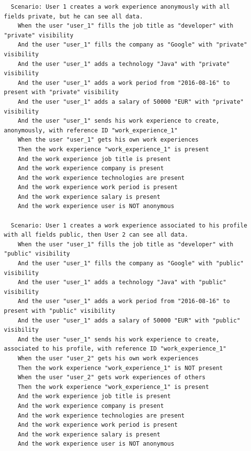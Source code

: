 \documentclass[a4paper, 12pt]{book}
\begin{document}
{\begin{verbatim}
  Scenario: User 1 creates a work experience anonymously with all fields private, but he can see all data.
    When the user "user_1" fills the job title as "developer" with "private" visibility
    And the user "user_1" fills the company as "Google" with "private" visibility
    And the user "user_1" adds a technology "Java" with "private" visibility
    And the user "user_1" adds a work period from "2016-08-16" to present with "private" visibility
    And the user "user_1" adds a salary of 50000 "EUR" with "private" visibility
    And the user "user_1" sends his work experience to create, anonymously, with reference ID "work_experience_1"
    When the user "user_1" gets his own work experiences
    Then the work experience "work_experience_1" is present
    And the work experience job title is present
    And the work experience company is present
    And the work experience technologies are present
    And the work experience work period is present
    And the work experience salary is present
    And the work experience user is NOT anonymous

  Scenario: User 1 creates a work experience associated to his profile with all fields public, then User 2 can see all data.
    When the user "user_1" fills the job title as "developer" with "public" visibility
    And the user "user_1" fills the company as "Google" with "public" visibility
    And the user "user_1" adds a technology "Java" with "public" visibility
    And the user "user_1" adds a work period from "2016-08-16" to present with "public" visibility
    And the user "user_1" adds a salary of 50000 "EUR" with "public" visibility
    And the user "user_1" sends his work experience to create, associated to his profile, with reference ID "work_experience_1"
    When the user "user_2" gets his own work experiences
    Then the work experience "work_experience_1" is NOT present
    When the user "user_2" gets work experiences of others
    Then the work experience "work_experience_1" is present
    And the work experience job title is present
    And the work experience company is present
    And the work experience technologies are present
    And the work experience work period is present
    And the work experience salary is present
    And the work experience user is NOT anonymous


\end{verbatim}}
\end{document}
